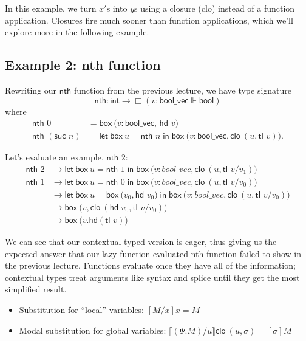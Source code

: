 \documentclass[11pt]{article}
\newcommand{\letin}[2]{\ensuremath{\textsf{let}~#1 \mathrel{\textsf{in}} #2}}
\newcommand{\BOX}[1]{\ensuremath{\textsf{box}~#1}}
\newcommand{\clo}[1]{\ensuremath{\textsf{clo}~#1}}
\begin{document}
In this example, we turn $x'$s into $y$s using a closure (\textsf{clo}) instead of a function application. Closures fire much sooner than function applications, which we'll explore more in the following example.

\subsection{Example 2: \textsf{nth} function}
Rewriting our $\textsf{nth}$ function from the previous lecture, we have type signature 
$$\textsf{nth}: \textsf{int} \longrightarrow \Box(v: \textsf{bool\_vec} \Vdash \textsf{bool})$$ where
\begin{align*}
    \textsf{nth } 0 & = \BOX(v: \textsf{bool\_vec},\,\textsf{hd } v) \\
    \textsf{nth } (\textsf{suc } n) & = \letin{\BOX u = \textsf{nth }n}{\BOX(v: \textsf{bool\_vec}, \clo{(u, \textsf{tl }v)})}.
\end{align*}

Let's evaluate an example, $\textsf{nth } 2$:
\begin{align*}
    \textsf{nth }2 & \longrightarrow  \letin{\BOX u = \textsf{nth }1}{\BOX(v:{bool\_vec}, \clo{(u, \textsf{tl }v/v_1)})}\\
    \textsf{nth } 1 & \longrightarrow \letin{\BOX u = \textsf{nth }0}{\BOX(v:{bool\_vec}, \clo{(u, \textsf{tl }v/v_0)})}\\
    &\longrightarrow \letin{\BOX u = \BOX(v_0, \textsf{hd }v_0)}{\BOX(v:{bool\_vec}, \clo{(u, \textsf{tl }v/v_0)})}\\
    &\longrightarrow \BOX(v, \clo{(\textsf{hd }v_0, \textsf{tl }v/v_0)}) \\
    &\longrightarrow \BOX(v. \textsf{hd}(\textsf{tl }v))
\end{align*}

We can see that our contextual-typed version is eager, thus giving us the expected answer that our lazy function-evaluated \textsf{nth } function failed to show in the previous lecture. Functions evaluate once they have all of the information; contextual types treat arguments like syntax and splice until they get the most simplified result.
\begin{itemize}
    \item Substitution for ``local'' variables: $[M/x]x = M$
    \item Modal substitution for global variables: $\llbracket (\Psi. M)/u\rrbracket \clo{(u, \sigma)} = [\sigma] M$
\end{itemize}
\end{document}
